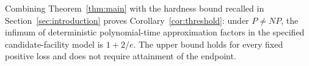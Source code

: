 Combining Theorem~\ref{thm:main} with the hardness bound recalled in
Section~\ref{sec:introduction} proves Corollary~\ref{cor:threshold}:
under \(P\ne NP\), the infimum of deterministic polynomial-time
approximation factors in the specified candidate-facility model is
\(1+2/e\). The upper bound holds for every fixed positive loss and
does not require attainment of the endpoint.
